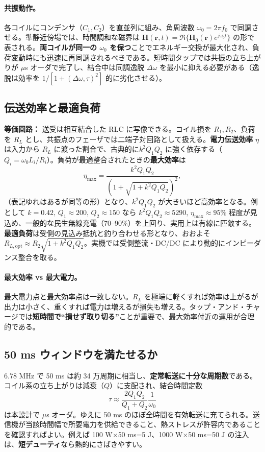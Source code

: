 \documentclass[11pt]{ctexart}
\begin{document}
\paragraph{共振動作。} 各コイルにコンデンサ（$C_1,C_2$）を直並列に組み、角周波数 $\omega_0=2\pi f_0$ で同調させる。準静近傍場では、時間調和な磁界は $\mathbf{H}(\mathbf{r},t)=\Re\{\mathbf{H}_0(\mathbf{r})e^{j\omega_0 t}\}$ の形で表される。\textbf{両コイルが同一の $\omega_0$ を保つ}ことでエネルギー交換が最大化され、負荷変動時にも迅速に再同調されるべきである。短時間タップでは共振の立ち上がりが $\mu$s オーダで完了し、結合中は同調逸脱 $\Delta\omega$ を最小に抑える必要がある（逸脱は効率を $1/[1+(\Delta\omega,\tau)^2]$ 的に劣化させる）。

\subsection{伝送効率と最適負荷}
\textbf{等価回路：} 送受は相互結合した RLC に写像できる。コイル損を $R_1,R_2$、負荷を $R_L$ とし、共振点のフェーザでは二端子対回路として扱える。\textbf{電力伝送効率} $\eta$ は入力から $R_L$ に渡った割合で、古典的に\textbf{$k^2Q_1Q_2$} に強く依存する（$Q_i=\omega_0 L_i/R_i$）。負荷が最適整合されたときの\textbf{最大効率}は
\begin{equation}
\eta_{\max}=\frac{k^2Q_1Q_2}{\left(1+\sqrt{1+k^2Q_1Q_2}\right)^2},
\end{equation}
（表記ゆれはあるが同等の形）となり、$k^2Q_1Q_2$ が大きいほど高効率となる。例として $k=0.42,\,Q_1\approx200,\,Q_2\approx150$ なら $k^2Q_1Q_2\approx5290$, $\eta_{\max}\approx95\%$ 程度が見込め、一般的な民生無線充電（70--90\%）を上回り、実用上は有線に匹敵する。\textbf{最適負荷}は受側の見込み抵抗と釣り合わせる形となり、おおよそ $R_{L,\mathrm{opt}}\approx R_2\sqrt{1+k^2Q_1Q_2}$。実機では受側整流・DC/DC により動的にインピーダンス整合を取る。

\paragraph{最大効率 vs 最大電力。} 最大電力点と最大効率点は一致しない。$R_L$ を極端に軽くすれば効率は上がるが出力は小さく、重くすれば電力は増えるが損失も増える。タップ・アンド・チャージでは\textbf{短時間で“損せず取り切る”}ことが重要で、最大効率付近の運用が合理的である。

\subsection{50 ms ウィンドウを満たせるか}
6.78 MHz で 50 ms は約 34 万周期に相当し、\textbf{定常転送に十分な周期数}である。コイル系の立ち上がりは減衰（$Q$）に支配され、結合時間定数
\begin{equation}
\tau\approx \frac{2Q_1Q_2}{Q_1+Q_2}\frac{1}{\omega_0}
\end{equation}
は本設計で $\mu$s オーダ。ゆえに 50 ms のほぼ全時間を有効転送に充てられる。送信機が当該時間幅で所要電力を供給できること、熱ストレスが許容内であることを確認すればよい。例えば 100 W$\times$50 ms=5 J、1000 W$\times$50 ms=50 J の注入は、\textbf{短デューティ}なら熱的にさばきやすい。
\end{document}
